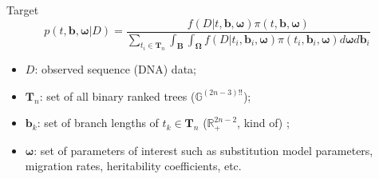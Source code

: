 \documentclass[newPxFont,numfooter,sectionpages]{beamer}
\begin{document}
\begin{frame}{Target}
\begin{equation}
\label{eq:posterior}
 p(t, \boldsymbol b, \boldsymbol \omega | D) = \frac{f(D | t, \boldsymbol b, \boldsymbol \omega ) \pi(t, \boldsymbol b, \boldsymbol \omega )}{\sum_{t_i \in \boldsymbol T_n} \int_{\boldsymbol B}\int_{\boldsymbol \Omega} f(D | t_i, \boldsymbol b_i, \boldsymbol \omega ) \pi(t_i, \boldsymbol b_i, \boldsymbol \omega ) d\boldsymbol\omega d\boldsymbol b_i}
\end{equation}
\begin{itemize}
 \item $D$: observed sequence (DNA) data;
 \item $\boldsymbol T_n$: set of all binary ranked trees ($\mathbb{G} ^{(2n-3)!!}$);
 \item $\boldsymbol b_k$: set of branch lengths of $t_k \in \boldsymbol T_n$ ($\mathbb{R}^{2n-2}_+$, kind of) ;
 \item $\boldsymbol \omega$: set of parameters of interest such as substitution model parameters, migration rates, heritability coefficients, etc.
\end{itemize}
\end{frame}
\end{document}
